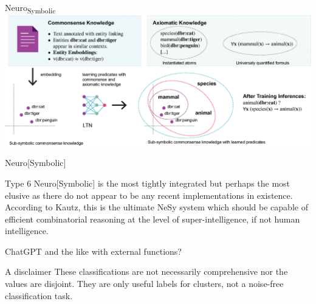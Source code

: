 \documentclass{lecture}
\begin{document}
\begin{frame}{Neuro\textsubscript{Symbolic}}
    \centering\includegraphics[width=\textwidth]{SW223228/bianchi2019.eps}
\end{frame}

\begin{frame}{Neuro[Symbolic]}
    \begin{block}{}
        Type 6 Neuro[Symbolic] is the most tightly integrated but perhaps the most elusive as there do not appear to be
any recent implementations in existence. According to Kautz, this is the ultimate NeSy system which should be
capable of efficient combinatorial reasoning at the level of super-intelligence, if not human intelligence.
    \end{block}
    \pause
    \vspace{1cm}
    ChatGPT and the like with external functions?
\end{frame}

\begin{frame}{A disclaimer}
    These classifications are not necessarily comprehensive nor the values are disjoint.
    They are only useful labels for \alert{clusters}, not a noise-free classification task.
\end{frame}
\end{document}
